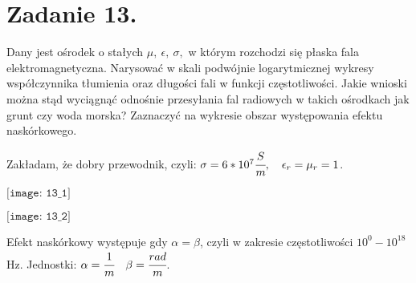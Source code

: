 \section*{Zadanie 13.}
\begin{task}
Dany jest ośrodek o stałych $\mu,\ \epsilon,\ \sigma,$ w którym rozchodzi się płaska fala elektromagnetyczna. Narysować w skali podwójnie logarytmicznej wykresy współczynnika tłumienia oraz długości fali w funkcji częstotliwości. Jakie wnioski można stąd wyciągnąć odnośnie przesyłania fal radiowych w takich ośrodkach jak grunt czy woda morska? Zaznaczyć na wykresie obszar występowania efektu naskórkowego.\\
\end{task}

\begin{solution}


Zakładam, że dobry przewodnik, czyli: $\sigma=6*10^{7}\cfrac{S}{m}, \ \ \ \epsilon_{r}=\mu_{r}=1$.

\begin{center}
$\texttt{[image: 13\_1]}$\\
\end{center}
\begin{center}
$\texttt{[image: 13\_2]}$\\
\end{center}

Efekt naskórkowy występuje gdy $\alpha = \beta$, czyli w zakresie częstotliwości $10^{0} - 10^{18}$ Hz. Jednostki: $\alpha = \cfrac{1}{m}\ \ \ \beta=\cfrac{rad}{m}$.

\end{solution}